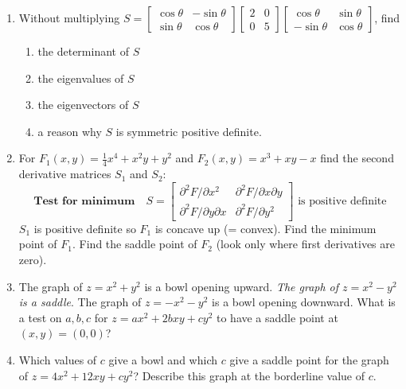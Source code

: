 \documentclass[14pt, a4paper]{article}
\begin{document}
\begin{enumerate}[resume]
    \item Without multiplying $S = \begin{bmatrix} \cos \theta & -\sin \theta \\ \sin \theta & \cos \theta \end{bmatrix} \begin{bmatrix} 2 & 0 \\ 0 & 5 \end{bmatrix} \begin{bmatrix} \cos \theta & \sin \theta \\ -\sin \theta & \cos \theta \end{bmatrix}$, find
          \begin{enumerate}
              \item the determinant of $S$
              \item the eigenvalues of $S$
              \item the eigenvectors of $S$
              \item a reason why $S$ is symmetric positive definite.
          \end{enumerate}

    \item For $F_1(x, y) = \frac{1}{4}x^4 + x^2y + y^2$ and $F_2(x, y) = x^3 + xy - x$ find the second derivative matrices $S_1$ and $S_2$:
          \[
              \textbf{Test for minimum} \quad S = \begin{bmatrix} \partial^2F/\partial x^2 & \partial^2F/\partial x\partial y \\ \partial^2F/\partial y\partial x & \partial^2F/\partial y^2 \end{bmatrix} \text{ is positive definite}
          \]
          $S_1$ is positive definite so $F_1$ is concave up (= convex). Find the minimum point of $F_1$. Find the saddle point of $F_2$ (look only where first derivatives are zero).

    \item The graph of $z = x^2 + y^2$ is a bowl opening upward. \textit{The graph of $z = x^2 - y^2$ is a saddle}. The graph of $z = -x^2 - y^2$ is a bowl opening downward. What is a test on $a, b, c$ for $z = ax^2 + 2bxy + cy^2$ to have a saddle point at $(x, y) = (0, 0)$?

    \item Which values of $c$ give a bowl and which $c$ give a saddle point for the graph of $z = 4x^2 + 12xy + cy^2$? Describe this graph at the borderline value of $c$.


\end{enumerate}
\end{document}
